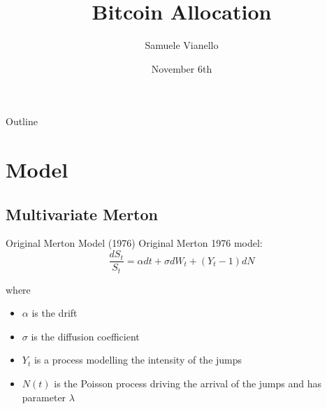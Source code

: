 \documentclass{beamer}
\title[Your Short Title]{Bitcoin Allocation}
\author{Samuele Vianello}
\date{November 6th}
\begin{document}
\begin{frame}
  \titlepage
\end{frame}

\begin{frame}{Outline}
  \tableofcontents
\end{frame}


%
%

%

\section{Model}

\subsection{Multivariate Merton}

\begin{frame}{Original Merton Model (1976)}
Original Merton 1976 model:
\begin{equation}
\label{merton_model}
    \frac{dS_t}{S_t} = \alpha dt + \sigma dW_t  + (Y_t-1)dN
\end{equation}

where 
\begin{itemize}
    \item $\alpha$ is the drift
    \item $\sigma$ is the diffusion coefficient
    \item $Y_t$ is a process modelling the intensity of the jumps
    \item $N(t)$ is the Poisson process driving the arrival of the jumps and has parameter $\lambda$
\end{itemize}

\end{frame}
\end{document}
